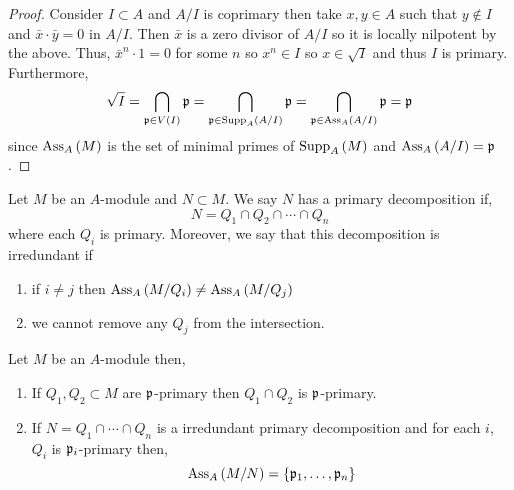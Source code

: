 \documentclass[12pt]{article}
\begin{document}
\begin{proof}
Consider $I \subset A$ and $A / I$ is coprimary then take $x,y \in A$ such that $y \notin I$ and $\bar{x} \cdot \bar{y} = 0$ in $A / I$. Then $\bar{x}$ is a zero divisor of $A / I$ so it is locally nilpotent by the above. Thus, $\bar{x}^n \cdot 1 = 0$ for some $n$ so $x^n \in I$ so $x \in \sqrt{I}$ and thus $I$ is primary. Furthermore,
\[ \sqrt{I} = \bigcap_{\mathfrak{p} \in V(I)} \mathfrak{p} = \bigcap_{\mathfrak{p} \in \mathrm{Supp}_{A}\left(A / I \right)} \mathfrak{p} = \bigcap_{\mathfrak{p} \in \mathrm{Ass}_{A}\left( A / I \right)} \mathfrak{p} = \mathfrak{p} \]
since $\mathrm{Ass}_{A}\left( M \right)$ is the set of minimal primes of $\mathrm{Supp}_{A}\left(M \right)$ and $\mathrm{Ass}_{A}\left( A / I \right) = \mathfrak{p}$.  
\end{proof}

\begin{definition}
Let $M$ be an $A$-module and $N \subset M$. We say $N$ has a primary decomposition if,
\[ N = Q_1 \cap Q_2 \cap \cdots \cap Q_n \]
where each $Q_i$ is primary. Moreover, we say that this decomposition is irredundant if 
\begin{enumerate}
\item if $i \neq j$ then $\mathrm{Ass}_{A}\left( M / Q_i \right) \neq \mathrm{Ass}_{A}\left( M / Q_j \right)$ 

\item we cannot remove any $Q_j$ from the intersection.
\end{enumerate}
\end{definition}

\begin{lemma}
Let $M$ be an $A$-module then,
\begin{enumerate}
\item If $Q_1, Q_2 \subset M$ are $\mathfrak{p}$-primary then $Q_1 \cap Q_2$ is $\mathfrak{p}$-primary.  

\item If $N = Q_1 \cap \cdots \cap Q_n$ is a irredundant primary decomposition and for each $i$, $Q_i$ is $\mathfrak{p}_i$-primary then,
\[ \mathrm{Ass}_{A}\left( M / N \right) = \{ \mathfrak{p}_1, \dots, \mathfrak{p}_n \} \] 
\end{enumerate}
\end{lemma}
\end{document}
